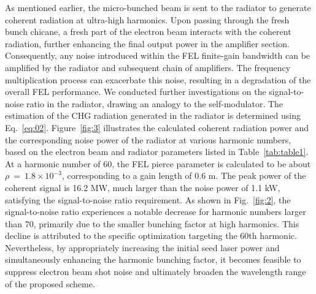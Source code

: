 \documentclass[%
 reprint,
 amsmath,amssymb,
 aps,
]{revtex4-2}
\begin{document}
As mentioned earlier, the micro-bunched beam is sent to the radiator to generate coherent radiation at ultra-high harmonics. Upon passing through the fresh bunch chicane, a fresh part of the electron beam interacts with the coherent radiation, further enhancing the final output power in the amplifier section. Consequently, any noise introduced within the FEL finite-gain bandwidth can be amplified by the radiator and subsequent chain of amplifiers. The frequency multiplication process can exacerbate this noise, resulting in a degradation of the overall FEL performance. We conducted further investigations on the signal-to-noise ratio in the radiator, drawing an analogy to the self-modulator. The estimation of the CHG radiation generated in the radiator is determined using Eq.~\ref{eq:02}. Figure~\ref{fig:3} illustrates the calculated coherent radiation power and the corresponding noise power of the radiator at various harmonic numbers, based on the electron beam and radiator parameters listed in Table~\ref{tab:table1}. At a harmonic number of 60, the FEL pierce parameter is calculated to be about $\rho\ =\ 1.8\times{10}^{-3}$, corresponding to a gain length of 0.6 m. The peak power of the coherent signal is 16.2 MW, much larger than the noise power of 1.1 kW, satisfying the signal-to-noise ratio requirement. As shown in Fig.~\ref{fig:2}, the signal-to-noise ratio experiences a notable decrease for harmonic numbers larger than 70, primarily due to the smaller bunching factor at high harmonics. This decline is attributed to the specific optimization targeting the 60th harmonic. Nevertheless, by appropriately increasing the initial seed laser power and simultaneously enhancing the harmonic bunching factor, it becomes feasible to suppress electron beam shot noise and ultimately broaden the wavelength range of the proposed scheme.
\end{document}
